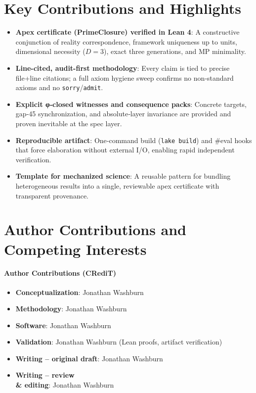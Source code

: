 \documentclass{article}
\begin{document}
\section{Key Contributions and Highlights}
\begin{itemize}[leftmargin=*]
  \item \textbf{Apex certificate (PrimeClosure) verified in Lean 4}: A constructive conjunction of reality correspondence, framework uniqueness up to units, dimensional necessity (\(D=3\)), exact three generations, and MP minimality.
  \item \textbf{Line-cited, audit-first methodology}: Every claim is tied to precise file+line citations; a full axiom hygiene sweep confirms no non‑standard axioms and no \texttt{sorry}/\texttt{admit}.
  \item \textbf{Explicit φ‑closed witnesses and consequence packs}: Concrete targets, gap‑45 synchronization, and absolute‑layer invariance are provided and proven inevitable at the spec layer.
  \item \textbf{Reproducible artifact}: One‑command build (\texttt{lake build}) and #eval hooks that force elaboration without external I/O, enabling rapid independent verification.
  \item \textbf{Template for mechanized science}: A reusable pattern for bundling heterogeneous results into a single, reviewable apex certificate with transparent provenance.
\end{itemize}

\section{Author Contributions and Competing Interests}
\paragraph{Author Contributions (CRediT)}
\begin{itemize}[leftmargin=*]
  \item \textbf{Conceptualization}: Jonathan Washburn
  \item \textbf{Methodology}: Jonathan Washburn
  \item \textbf{Software}: Jonathan Washburn
  \item \textbf{Validation}: Jonathan Washburn (Lean proofs, artifact verification)
  \item \textbf{Writing – original draft}: Jonathan Washburn
  \item \textbf{Writing – review \\& editing}: Jonathan Washburn
\end{itemize}
\end{document}
